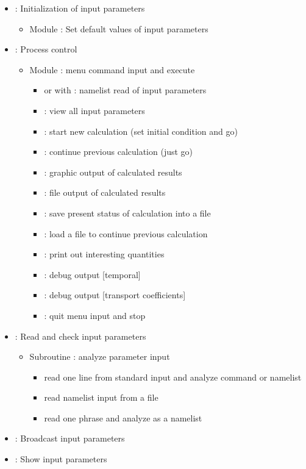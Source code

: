 \documentclass[11pt]{article}
\begin{document}
\begin{itemize}
\begin{itemize}
  \item {}: Initialization of input parameters
    \begin{itemize}
    \item
      Module : Set default values of input parameters
    \end{itemize}
    
  \item {}: Process control
    \begin{itemize}
    \item
      Module : menu command input and execute
      \begin{itemize}
      \item
         or with \ttype{=}: namelist read of input parameters
      \item
        : view all input parameters
      \item
        : start new calculation (set initial condition and
        go)
      \item
        : continue previous calculation (just go)
      \item
        : graphic output of calculated results
      \item
        : file output of calculated results
      \item
        : save present status of calculation into a file
      \item
        : load a file to continue previous calculation
      \item
        : print out interesting quantities
      \item
        : debug output [temporal]
      \item
        : debug output [transport coefficients]
      \item
        : quit menu input and stop
      \end{itemize}
    \end{itemize}
    
  \item {}: Read and check input parameters
    \begin{itemize}
    \item
      Subroutine : analyze parameter input
      \begin{itemize}
      \item
        read one line from standard input and analyze command or
        namelist
      \item
        read namelist input from a file
      \item
        read one phrase and analyze as a namelist
      \end{itemize}
    \end{itemize}
  \item {}: Broadcast input parameters
  \item {}: Show input parameters
  \end{itemize}


\end{itemize}
\end{document}
